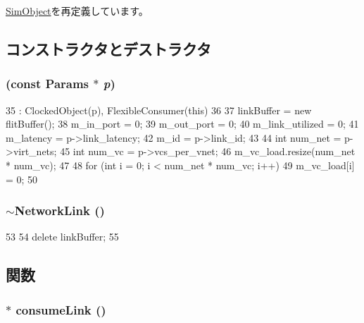 \hyperlink{classSimObject_a0f0761d2db586a23bb2a2880b8f387bb}{SimObject}を再定義しています。

\subsection{コンストラクタとデストラクタ}
\hypertarget{classNetworkLink_a09a2f79e20e84a934b9cfb26de2a195c}{
\subsubsection[{NetworkLink}]{ (const {\bf Params} $\ast$ {\em p})}}
\label{classNetworkLink_a09a2f79e20e84a934b9cfb26de2a195c}



\begin{DoxyCode}
35     : ClockedObject(p), FlexibleConsumer(this)
36 {
37     linkBuffer = new flitBuffer();
38     m_in_port = 0;
39     m_out_port = 0;
40     m_link_utilized = 0;
41     m_latency = p->link_latency;
42     m_id = p->link_id;
43 
44     int num_net = p->virt_nets;
45     int num_vc = p->vcs_per_vnet;
46     m_vc_load.resize(num_net * num_vc);
47 
48     for (int i = 0; i < num_net * num_vc; i++)
49         m_vc_load[i] = 0;
50 }
\end{DoxyCode}
\hypertarget{classNetworkLink_a68b002a2a7e75981425457f027cb4474}{
\subsubsection[{$\sim$NetworkLink}]{\setlength{\rightskip}{0pt plus 5cm}$\sim${\bf NetworkLink} ()}}
\label{classNetworkLink_a68b002a2a7e75981425457f027cb4474}



\begin{DoxyCode}
53 {
54     delete linkBuffer;
55 }
\end{DoxyCode}


\subsection{関数}
\hypertarget{classNetworkLink_a01ad504bd5f2e56abcff256bc4db0c22}{
\subsubsection[{consumeLink}]{ $\ast$ consumeLink ()}}
\label{classNetworkLink_a01ad504bd5f2e56abcff256bc4db0c22}



